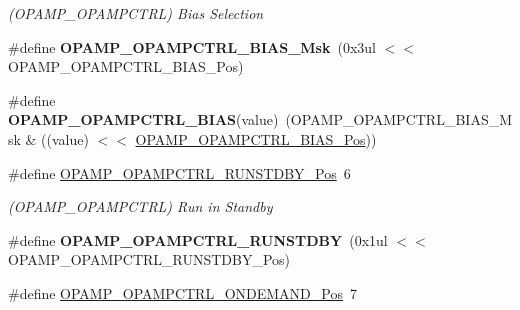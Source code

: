 \begin{DoxyCompactItemize}
\begin{DoxyCompactList}\small\item\em (O\+P\+A\+M\+P\+\_\+\+O\+P\+A\+M\+P\+C\+T\+R\+L) Bias Selection \end{DoxyCompactList}\item 
\hypertarget{group___s_a_m_l21___o_p_a_m_p_ga06a75bcb4b309c5c50284864a3aa4ea2}{}\#define {\bfseries O\+P\+A\+M\+P\+\_\+\+O\+P\+A\+M\+P\+C\+T\+R\+L\+\_\+\+B\+I\+A\+S\+\_\+\+Msk}~(0x3ul $<$$<$ O\+P\+A\+M\+P\+\_\+\+O\+P\+A\+M\+P\+C\+T\+R\+L\+\_\+\+B\+I\+A\+S\+\_\+\+Pos)\label{group___s_a_m_l21___o_p_a_m_p_ga06a75bcb4b309c5c50284864a3aa4ea2}

\item 
\hypertarget{group___s_a_m_l21___o_p_a_m_p_ga2aaf8f90e6e7adc6ed14b09f27a8b37d}{}\#define {\bfseries O\+P\+A\+M\+P\+\_\+\+O\+P\+A\+M\+P\+C\+T\+R\+L\+\_\+\+B\+I\+A\+S}(value)~(O\+P\+A\+M\+P\+\_\+\+O\+P\+A\+M\+P\+C\+T\+R\+L\+\_\+\+B\+I\+A\+S\+\_\+\+Msk \& ((value) $<$$<$ \hyperlink{group___s_a_m_l21___o_p_a_m_p_ga39618660caa87edecc46817bb1215e52}{O\+P\+A\+M\+P\+\_\+\+O\+P\+A\+M\+P\+C\+T\+R\+L\+\_\+\+B\+I\+A\+S\+\_\+\+Pos}))\label{group___s_a_m_l21___o_p_a_m_p_ga2aaf8f90e6e7adc6ed14b09f27a8b37d}

\item 
\hypertarget{group___s_a_m_l21___o_p_a_m_p_ga76d27d55f4961e7cd46a4b2a100f25ba}{}\#define \hyperlink{group___s_a_m_l21___o_p_a_m_p_ga76d27d55f4961e7cd46a4b2a100f25ba}{O\+P\+A\+M\+P\+\_\+\+O\+P\+A\+M\+P\+C\+T\+R\+L\+\_\+\+R\+U\+N\+S\+T\+D\+B\+Y\+\_\+\+Pos}~6\label{group___s_a_m_l21___o_p_a_m_p_ga76d27d55f4961e7cd46a4b2a100f25ba}

\begin{DoxyCompactList}\small\item\em (O\+P\+A\+M\+P\+\_\+\+O\+P\+A\+M\+P\+C\+T\+R\+L) Run in Standby \end{DoxyCompactList}\item 
\hypertarget{group___s_a_m_l21___o_p_a_m_p_ga3970b08b2157580a7d879b5ef7129e9f}{}\#define {\bfseries O\+P\+A\+M\+P\+\_\+\+O\+P\+A\+M\+P\+C\+T\+R\+L\+\_\+\+R\+U\+N\+S\+T\+D\+B\+Y}~(0x1ul $<$$<$ O\+P\+A\+M\+P\+\_\+\+O\+P\+A\+M\+P\+C\+T\+R\+L\+\_\+\+R\+U\+N\+S\+T\+D\+B\+Y\+\_\+\+Pos)\label{group___s_a_m_l21___o_p_a_m_p_ga3970b08b2157580a7d879b5ef7129e9f}

\item 
\hypertarget{group___s_a_m_l21___o_p_a_m_p_gaaa2c198c9f38e3eb38f9126d06831ebe}{}\#define \hyperlink{group___s_a_m_l21___o_p_a_m_p_gaaa2c198c9f38e3eb38f9126d06831ebe}{O\+P\+A\+M\+P\+\_\+\+O\+P\+A\+M\+P\+C\+T\+R\+L\+\_\+\+O\+N\+D\+E\+M\+A\+N\+D\+\_\+\+Pos}~7\label{group___s_a_m_l21___o_p_a_m_p_gaaa2c198c9f38e3eb38f9126d06831ebe}


\end{DoxyCompactItemize}
